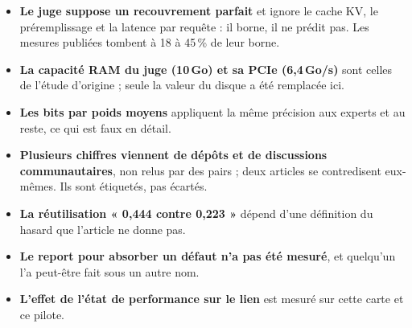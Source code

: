 \begin{faux}
\begin{itemize}
\item \textbf{Le juge suppose un recouvrement parfait} et ignore le cache KV, le préremplissage et la latence par requête : il borne, il ne prédit pas. Les mesures publiées tombent à 18 à 45\,\% de leur borne.
\item \textbf{La capacité RAM du juge (10\,Go) et sa PCIe (6,4\,Go/s)} sont celles de l'étude d'origine ; seule la valeur du disque a été remplacée ici.
\item \textbf{Les bits par poids moyens} appliquent la même précision aux experts et au reste, ce qui est faux en détail.
\item \textbf{Plusieurs chiffres viennent de dépôts et de discussions communautaires}, non relus par des pairs ; deux articles se contredisent eux-mêmes. Ils sont étiquetés, pas écartés.
\item \textbf{La réutilisation « 0,444 contre 0,223 »} dépend d'une définition du hasard que l'article ne donne pas.
\item \textbf{Le report pour absorber un défaut n'a pas été mesuré}, et quelqu'un l'a peut-être fait sous un autre nom.
\item \textbf{L'effet de l'état de performance sur le lien} est mesuré sur cette carte et ce pilote.
\end{itemize}
\end{faux}
